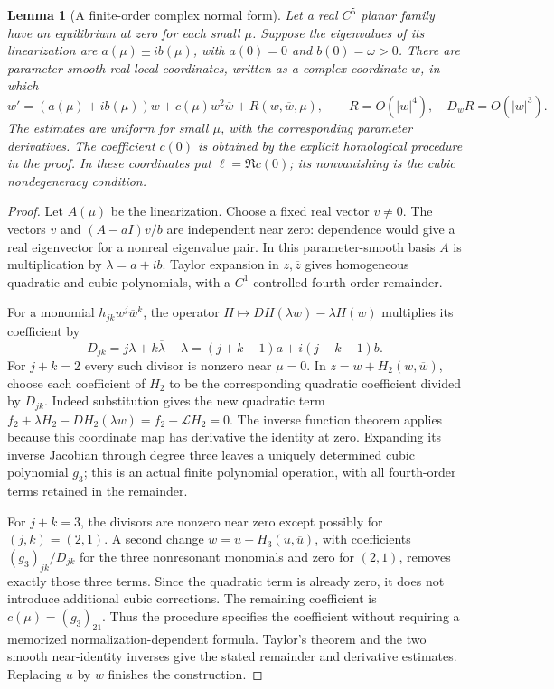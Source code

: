 \documentclass[11pt,oneside]{book}
\newtheorem{lemma}[theorem]{Lemma}
\theoremstyle{definition}
\theoremstyle{remark}\newtheorem{remark}[theorem]{Remark}
\newcommand{\abs}[1]{\lvert#1\rvert}\newcommand{\norm}[1]{\lVert#1\rVert}
\begin{document}
\begin{lemma}[A finite-order complex normal form]\label{d13:16:cubic-normal-form}
Let a real \(C^5\) planar family have an equilibrium at zero for each
small \(\mu\). Suppose the eigenvalues of its linearization are
\(a(\mu)\pm i b(\mu)\), with \(a(0)=0\) and \(b(0)=\omega>0\).
There are parameter-smooth real local coordinates, written as a complex
coordinate \(w\), in which
\[
 w'=(a(\mu)+ib(\mu))w+c(\mu)w^2\overline w+
       R(w,\overline w,\mu),\qquad R=O(\abs{w}^4),\quad
 D_wR=O(\abs{w}^3).
\]
The estimates are uniform for small \(\mu\), with the corresponding
parameter derivatives. The coefficient \(c(0)\) is obtained by the
explicit homological procedure in the proof. In these coordinates put
\(\ell=\Re c(0)\); its nonvanishing is the cubic nondegeneracy condition.
\end{lemma}
\begin{proof}
Let \(A(\mu)\) be the linearization. Choose a fixed real vector \(v\neq0\).
The vectors \(v\) and \((A-aI)v/b\) are independent near zero: dependence
would give a real eigenvector for a nonreal eigenvalue pair.
In this parameter-smooth basis \(A\) is multiplication by
\(\lambda=a+ib\). Taylor expansion in \(z,\overline z\) gives homogeneous
quadratic and cubic polynomials, with a \(C^1\)-controlled fourth-order
remainder.

For a monomial \(h_{jk}w^j\overline w^k\), the operator
\(H\mapsto DH(\lambda w)-\lambda H(w)\) multiplies its coefficient by
\[
 D_{jk}=j\lambda+k\overline\lambda-\lambda
       =(j+k-1)a+i(j-k-1)b.
\]
For \(j+k=2\) every such divisor is nonzero near \(\mu=0\).
In \(z=w+H_2(w,\overline w)\), choose each coefficient of \(H_2\)
to be the corresponding quadratic coefficient divided by \(D_{jk}\).
Indeed substitution gives the new quadratic term
\(f_2+\lambda H_2-DH_2(\lambda w)=f_2-\mathcal L H_2=0\).
The inverse function theorem applies because this coordinate map has
derivative the identity at zero. Expanding its inverse Jacobian through
degree three leaves a uniquely determined cubic polynomial \(g_3\);
this is an actual finite polynomial operation, with all fourth-order
terms retained in the remainder.

For \(j+k=3\), the divisors are nonzero near zero except possibly for
\((j,k)=(2,1)\). A second change \(w=u+H_3(u,\overline u)\), with
coefficients \((g_3)_{jk}/D_{jk}\) for the three nonresonant monomials
and zero for \((2,1)\), removes exactly those three terms.
Since the quadratic term is already zero, it does not introduce
additional cubic corrections. The remaining coefficient is
\(c(\mu)=(g_3)_{21}\). Thus the procedure specifies the coefficient
without requiring a memorized normalization-dependent formula.
Taylor's theorem and the two smooth near-identity inverses give the
stated remainder and derivative estimates. Replacing \(u\) by \(w\)
finishes the construction.
\end{proof}
\end{document}
